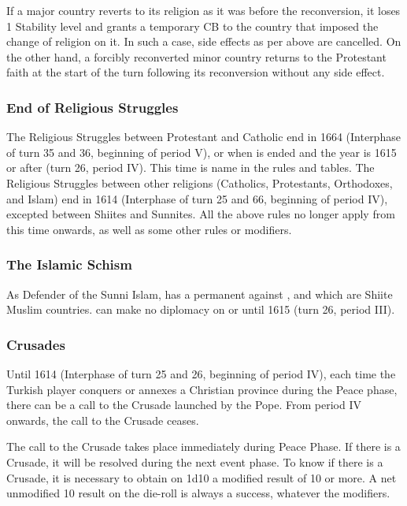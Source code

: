 \bparag If a major country reverts to its religion as it was before the
reconversion, it loses 1 Stability level and grants a temporary CB to the
country that imposed the change of religion on it. In such a case, side
effects as per above are cancelled.
\bparag On the other hand, a forcibly reconverted minor country returns to the
Protestant faith at the start of the turn following its reconversion without
any side effect.


\subsubsection{End of Religious Struggles}
\aparag The Religious Struggles between Protestant and Catholic end in 1664
(Interphase of turn 35 and 36, beginning of period V), or when
 is ended and the year is 1615 or after (turn 26, period
IV). This time is name  in the rules and
tables.
\aparag The Religious Struggles between other religions (Catholics,
Protestants, Orthodoxes, and Islam) end in 1614 (Interphase of turn 25 and 66,
beginning of period IV), excepted between Shiites and Sunnites.
\aparag All the above rules no longer apply from this time onwards, as well as
some other rules or modifiers.


\subsubsection{The Islamic Schism}\label{chSpecific:Islam}
\aparag As Defender of the Sunni Islam, \TUR has a permanent \CB against
,  and  which are Shiite Muslim
countries.
\aparag \TUR can make no diplomacy on  or  until 1615
(turn 26, period III).

\label{chSpecific:Crusades and Vienna}


\subsubsection{Crusades}\label{chSpecific:Crusades}
\aparag Until 1614 (Interphase of turn 25 and 26, beginning of period IV),
each time the Turkish player conquers or annexes a Christian province during
the Peace phase, there can be a call to the Crusade launched by the Pope. From
period IV onwards, the call to the Crusade ceases.

The call to the Crusade takes place immediately during Peace Phase. If there
is a Crusade, it will be resolved during the next event phase.
\bparag To know if there is a Crusade, it is necessary to obtain on 1d10 a
modified result of 10 or more.  A net unmodified 10 result on the die-roll is
always a success, whatever the modifiers.

